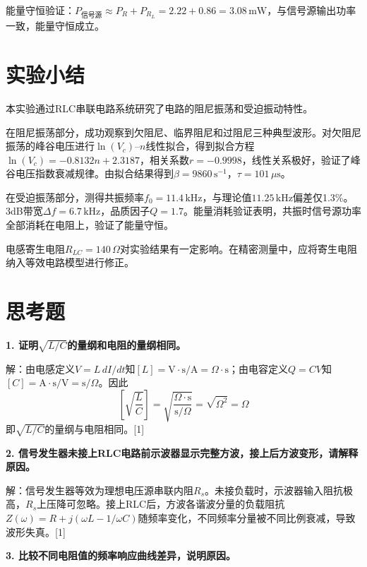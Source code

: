 \documentclass[12pt, a4paper]{article}
\begin{document}
能量守恒验证：$P_{\text{信号源}} \approx P_R + P_{R_L} = 2.22 + 0.86 = 3.08\,\mathrm{mW}$，与信号源输出功率一致，能量守恒成立。

\section*{实验小结}

本实验通过RLC串联电路系统研究了电路的阻尼振荡和受迫振动特性。

在阻尼振荡部分，成功观察到欠阻尼、临界阻尼和过阻尼三种典型波形。对欠阻尼振荡的峰谷电压进行$\ln(V_c)$--$n$线性拟合，得到拟合方程$\ln(V_c) = -0.8132n + 2.3187$，相关系数$r = -0.9998$，线性关系极好，验证了峰谷电压指数衰减规律。由拟合结果得到$\beta = 9860\,\mathrm{s^{-1}}$，$\tau = 101\,\mu\mathrm{s}$。

在受迫振荡部分，测得共振频率$f_0 = 11.4\,\mathrm{kHz}$，与理论值$11.25\,\mathrm{kHz}$偏差仅1.3\%。3dB带宽$\Delta f = 6.7\,\mathrm{kHz}$，品质因子$Q = 1.7$。能量消耗验证表明，共振时信号源功率全部消耗在电阻上，验证了能量守恒。

电感寄生电阻$R_{LC} = 140\,\Omega$对实验结果有一定影响。在精密测量中，应将寄生电阻纳入等效电路模型进行修正。

\section*{思考题}

\textbf{1. 证明$\sqrt{L/C}$的量纲和电阻的量纲相同。}

解：由电感定义$V = L\,dI/dt$知$[L] = \mathrm{V\cdot s/A} = \Omega\cdot\mathrm{s}$；由电容定义$Q = CV$知$[C] = \mathrm{A\cdot s/V} = \mathrm{s}/\Omega$。因此
\[
    \left[\sqrt{\frac{L}{C}}\right] = \sqrt{\frac{\Omega\cdot\mathrm{s}}{\mathrm{s}/\Omega}} = \sqrt{\Omega^2} = \Omega
\]
即$\sqrt{L/C}$的量纲与电阻相同。[1]

\vspace{0.3cm}
\textbf{2. 信号发生器未接上RLC电路前示波器显示完整方波，接上后方波变形，请解释原因。}

解：信号发生器等效为理想电压源串联内阻$R_s$。未接负载时，示波器输入阻抗极高，$R_s$上压降可忽略。接上RLC后，方波各谐波分量的负载阻抗$Z(\omega) = R + j(\omega L - 1/\omega C)$随频率变化，不同频率分量被不同比例衰减，导致波形失真。[1]

\vspace{0.3cm}
\textbf{3. 比较不同电阻值的频率响应曲线差异，说明原因。}
\end{document}
